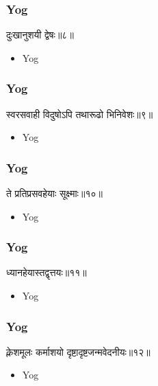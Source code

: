 \begin{frame}[fragile]\frametitle{Yog}
\begin{sanskrit}
दुःखानुशयी द्वेषः॥८॥
\end{sanskrit}
	\begin{itemize}
	\item Yog 
	\end{itemize}
\end{frame}



\begin{frame}[fragile]\frametitle{Yog}
\begin{sanskrit}
स्वरसवाही विदुषोऽपि तथारूढो भिनिवेशः॥९॥
\end{sanskrit}
	\begin{itemize}
	\item Yog 
	\end{itemize}
\end{frame}


\begin{frame}[fragile]\frametitle{Yog}
\begin{sanskrit}
ते प्रतिप्रसवहेयाः सूक्ष्माः॥१०॥
\end{sanskrit}
	\begin{itemize}
	\item Yog 
	\end{itemize}
\end{frame}


\begin{frame}[fragile]\frametitle{Yog}
\begin{sanskrit}
ध्यानहेयास्तद्वृत्तयः॥११॥
\end{sanskrit}
	\begin{itemize}
	\item Yog 
	\end{itemize}
\end{frame}


\begin{frame}[fragile]\frametitle{Yog}
\begin{sanskrit}
क्लेशमूलः कर्माशयो दृष्टादृष्टजन्मवेदनीयः॥१२॥
\end{sanskrit}
	\begin{itemize}
	\item Yog 
	\end{itemize}
\end{frame}


